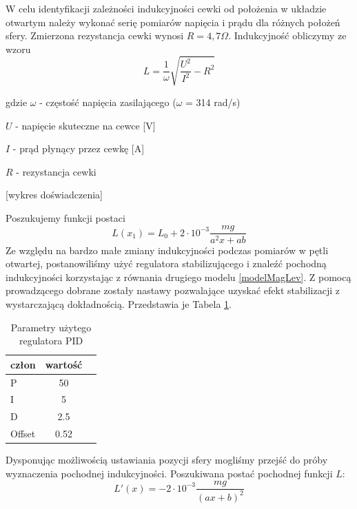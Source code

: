 W celu identyfikacji zależności indukcyjności cewki od położenia w układzie otwartym należy wykonać serię pomiarów napięcia i prądu dla różnych położeń sfery. Zmierzona rezystancja cewki wynosi $R = 4,7\Omega$. Indukcyjność obliczymy ze wzoru
\begin{equation}
L = \dfrac{1}{\omega}\sqrt{\dfrac{U^2}{I^2} - R^2}
\end{equation}

gdzie
$\omega$ - częstość napięcia zasilającego ($\omega$ = 314 rad/s)

$U$ - napięcie skuteczne na cewce [V]

$I$ - prąd płynący przez cewkę [A]

$R$ - rezystancja cewki

[wykres doświadczenia]

Poszukujemy funkcji postaci
\begin{equation}
L(x_1) = L_0 + 2 \cdot 10^{-3} \dfrac{mg}{a^2x + ab}
\end{equation}
Ze względu na bardzo małe zmiany indukcyjności podczas pomiarów w pętli otwartej, postanowiliśmy użyć regulatora stabilizującego i znaleźć pochodną indukcyjności korzystając z równania drugiego modelu \ref{modelMagLev}.
Z pomocą prowadzącego dobrane zostały nastawy pozwalające uzyskać efekt stabilizacji z wystarczającą dokładnością. Przedstawia je Tabela \ref{tab:parametryPID}.

\begin{table}[ht]
\begin{center}
  \begin{tabular}{| l | c | r | }
    \hline
    człon & wartość \\ \hline
    P 		& 50 \\ \hline
    I 		& 5 \\ \hline
    D 		& 2.5 \\ \hline
    Offset 	& 0.52 \\
    \hline

  \end{tabular}
  \caption{Parametry użytego regulatora PID}
  \label{tab:parametryPID}
\end{center}
\end{table}

Dysponując możliwością ustawiania pozycji sfery mogliśmy przejść do próby wyznaczenia pochodnej indukcyjności. Poszukiwana postać pochodnej funkcji $L$:
\begin{equation}
L'(x) = - 2 \cdot 10^{-3}\dfrac{mg}{(ax + b)^2}
\end{equation}

